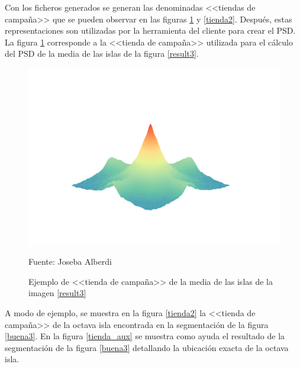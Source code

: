 Con los ficheros generados se generan las denominadas <<tiendas de campa\~{n}a>> que se pueden observar en las figuras \ref{tienda} y \ref{tienda2}. Despu\'{e}s, estas representaciones son utilizadas por la herramienta del cliente para crear el PSD. La figura \ref{tienda} corresponde a la <<tienda de campa\~{n}a>> utilizada para el c\'{a}lculo del PSD de la media de las islas de la figura \ref{result3}. 
 \vspace{-.7cm}
\begin{figure}[H]
	\captionsetup{justification=centering}
	\centering
	\includegraphics[width=.85\textwidth]{./pdfs/psd}
	\caption{Ejemplo de <<tienda de campa\~{n}a>> de la media de las islas de la imagen \ref{result3}}	
	\label{tienda}
	Fuente: Joseba Alberdi
\end{figure}

A modo de ejemplo, se muestra en la figura \ref{tienda2} la <<tienda de campa\~{n}a>> de la octava isla encontrada en la segmentaci\'{o}n de la figura \ref{buena3}. En la figura \ref{tienda_aux} se muestra como ayuda el resultado de la segmentaci\'{o}n de la figura \ref{buena3} detallando la ubicaci\'{o}n exacta de la octava isla.

